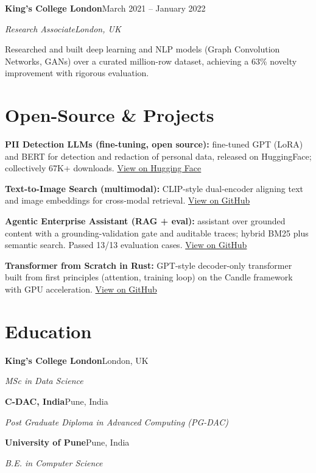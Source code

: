 \documentclass[10pt,a4paper]{article}
\newcommand{\entry}[4]{%
  {\color{company}\bfseries #1}\hfill {\color{muted}#2}\par
  \vspace{1pt}
  {\itshape #3}\hfill {\color{muted}\itshape #4}\par
  \vspace{3pt}%
}
\begin{document}
\entry{King's College London}{March 2021 -- January 2022}{Research Associate}{London, UK}
\begin{tight}
  \item Researched and built deep learning and NLP models (Graph Convolution Networks, GANs) over a curated million-row dataset, achieving a 63\% novelty improvement with rigorous evaluation.
\end{tight}

\section{Open-Source \& Projects}
\begin{tight}
  \item \textbf{PII Detection LLMs (fine-tuning, open source):} fine-tuned GPT (LoRA) and BERT for detection and redaction of personal data, released on HuggingFace; collectively 67K+ downloads. \href{https://huggingface.co/ab-ai/pii_model}{View on Hugging Face}
  \item \textbf{Text-to-Image Search (multimodal):} CLIP-style dual-encoder aligning text and image embeddings for cross-modal retrieval. \href{https://github.com/abhijeetscode/text-to-image-search}{View on GitHub}
  \item \textbf{Agentic Enterprise Assistant (RAG + eval):} assistant over grounded content with a grounding-validation gate and auditable traces; hybrid BM25 plus semantic search. Passed 13/13 evaluation cases. \href{https://github.com/abhijeetscode/Agentic-Enterprise-Assistant}{View on GitHub}
  \item \textbf{Transformer from Scratch in Rust:} GPT-style decoder-only transformer built from first principles (attention, training loop) on the Candle framework with GPU acceleration. \href{https://github.com/abhijeetscode/transformer-rust}{View on GitHub}
\end{tight}

\section{Education}
{\color{company}\bfseries King's College London}\hfill {\color{muted}London, UK}\par
{\itshape MSc in Data Science}\par\vspace{2pt}
{\color{company}\bfseries C-DAC, India}\hfill {\color{muted}Pune, India}\par
{\itshape Post Graduate Diploma in Advanced Computing (PG-DAC)}\par\vspace{2pt}
{\color{company}\bfseries University of Pune}\hfill {\color{muted}Pune, India}\par
{\itshape B.E. in Computer Science}\par
\end{document}
